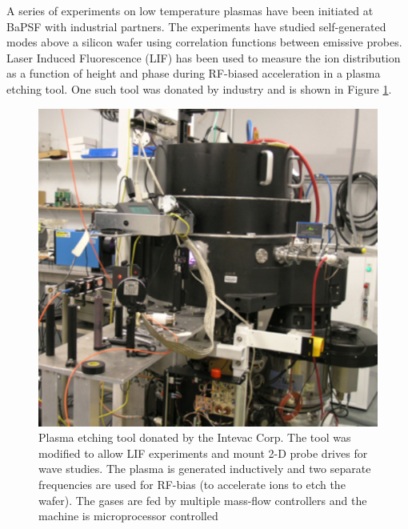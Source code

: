 \documentclass[11pt]{article}
\begin{document}
A series of experiments on low temperature plasmas have been initiated at BaPSF with industrial partners.  The experiments have studied self-generated modes above a silicon wafer using correlation functions between emissive probes.  Laser Induced Fluorescence (LIF) has been used to measure the ion distribution as a function of height and phase during RF-biased acceleration in a plasma etching tool.  One such tool was donated by industry and is shown in Figure \ref{fig:etchtool}.
\begin{figure}[h]
\centering
  \begin{minipage}[c]{0.5\textwidth}
    \includegraphics[width=\textwidth]{etchtool.jpg}
  \end{minipage}\hfill
  \begin{minipage}[c]{0.4\textwidth}
    \caption{Plasma etching tool donated by the Intevac Corp.  The tool was modified to allow LIF experiments and mount 2-D probe drives for wave studies.  The plasma is generated inductively and two separate frequencies are used for RF-bias (to accelerate ions to etch the wafer). The gases are fed by multiple mass-flow controllers and the machine is microprocessor controlled} 
    \label{fig:etchtool}
  \end{minipage}
\end{figure}
\end{document}
